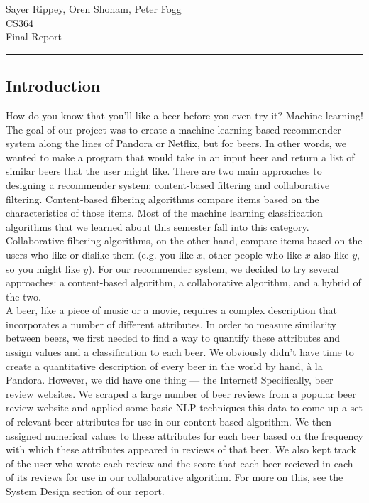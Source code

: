 \documentclass[11pt]{article}
\renewcommand{\maketitle}{
  \begin{center}
    \begin{flushright}
      Sayer Rippey, Oren Shoham, Peter Fogg \\
      CS364 \\
      Final Report
    \end{flushright}
    \rule{\linewidth}{0.1mm}
  \end{center}
}
\begin{document}
\maketitle
\subsection*{Introduction}
How do you know that you'll like a beer before you even try it? Machine learning! The goal of our project was to create a machine learning-based recommender system along the lines of Pandora or Netflix, but for beers. In other words, we wanted to make a program that would take in an input beer and return a list of similar beers that the user might like. There are two main approaches to designing a recommender system: content-based filtering and collaborative filtering. Content-based filtering algorithms compare items based on the characteristics of those items. Most of the  machine learning classification algorithms that we learned about this semester fall into this category. Collaborative filtering algorithms, on the other hand, compare items based on the users who like or dislike them (e.g. you like $x$, other people who like $x$ also like $y$, so you might like $y$). For our recommender system, we decided to try several approaches: a content-based algorithm, a collaborative algorithm, and a hybrid of the two. \\
\indent A beer, like a piece of music or a movie, requires a complex description that incorporates a number of different attributes. In order to measure similarity between beers, we first needed to find a way to quantify these attributes and assign values and a  classification to each beer. We obviously didn't have time to create a quantitative description of every beer in the world by hand, \`{a} la Pandora. However, we did have one thing --- the Internet! Specifically, beer review websites. We scraped a large number of beer reviews from a popular beer review website and applied some basic NLP techniques this data to come up a set of relevant beer attributes for use in our content-based algorithm. We then assigned numerical values to these attributes for each beer based on the frequency with which these attributes appeared in reviews of that beer.  We also kept track of the user who wrote each review and the score that each beer recieved in each of its reviews for use in our collaborative algorithm. For more on this, see the System Design section of our report.
\end{document}
